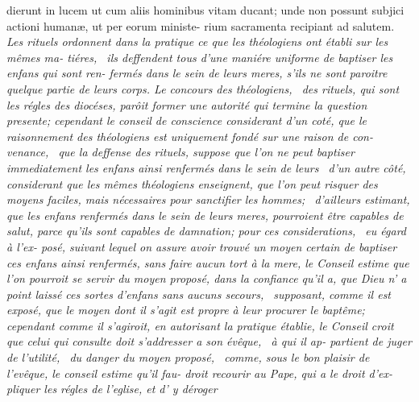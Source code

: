 \documentclass{article}
\begin{document}
\newpage
\bgroup\fontsize{9.6}{13}\selectfont\noindent
dierunt in lucem ut cum aliis hominibus\break
vitam ducant; unde non possunt subjici\break
actioni humanæ, ut per eorum ministe-\break
rium sacramenta recipiant ad salutem.\break
\fontsize{9.6}{13}\selectfont\itshape Les rituels ordonnent dans la
pratique ce que\break
les théologiens ont établi sur les mêmes ma-\break
tiéres, \et\ ils deffendent tous d’une maniére\break
uniforme de baptiser les enfans qui sont ren-\break
fermés dans le sein de leurs meres, s’ils ne\break
sont paroitre quelque partie de leurs corps.\break 
Le concours des théologiens, \et\ des rituels,\break
qui sont les régles des diocéses, parôit former\break
une autorité qui termine la question presente\textnormal{;}\break
cependant le conseil de conscience considerant\break
d’un coté, que le raisonnement des théologiens\break
est uniquement fondé sur une raison de con-\break
venance, \et\ que la deffense des rituels, suppose\break
que l’on ne peut baptiser immediatement les\break
enfans ainsi renfermés dans le sein de leurs\break
{}\break
\et\ d’un autre côté, considerant que les mêmes
théologiens enseignent, que l’on peut risquer\break
{}\break
des moyens faciles, mais nécessaires pour\break 
sanctifier les hommes; \et\ d’ailleurs estimant,\break
que les enfans renfermés dans le sein de leurs\break
meres, pourroient être capables de salut,\break
parce qu’ils sont capables de damnation\textnormal{;}\tsk\break 
pour ces considerations, \et\ eu égard à l’ex-\break
posé, suivant lequel on assure avoir trouvé\break
un moyen certain de baptiser ces enfans ainsi\break
renfermés, sans faire aucun tort à la mere,\break
le Conseil estime que l’on pourroit se servir du\break
moyen proposé, dans la confiance qu’il a, que\break
Dieu n’ a point laissé ces sortes d’enfans\break
sans aucuns secours, \et\ supposant, comme\break
il est exposé, que le moyen dont il s’agit est\break
propre à leur procurer le baptême\textnormal{;} cependant\break
comme il s’agiroit, en autorisant la pratique\break
{}\break
établie, le Conseil croit que celui qui consulte\break
doit s’addresser a son évêque, \et\ à qui il ap-
partient de juger de l’utilité, \et\ du danger\break
du moyen proposé, \et\ comme, sous le bon\break
plaisir de l’evêque, le conseil estime qu’il fau-\break
droit recourir au Pape, qui a le droit d’ex-\break
pliquer les régles de l’eglise, et d’ y déroger\break
\end{document}
